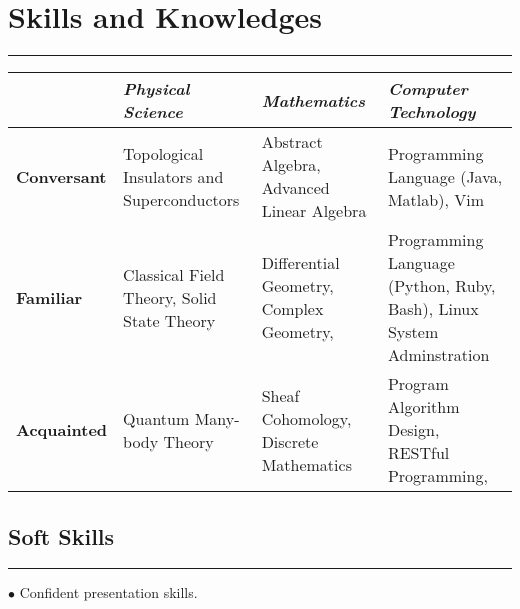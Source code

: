 \documentclass[letterpaper]{article}
\renewenvironment{itemize}{
  \begin{list}{}{
    \setlength{\leftmargin}{.5em}
  }
}{
  \end{list}
}
\begin{document}
\section*{Skills and Knowledges}
\vspace{-8pt}
\hrule height .7pt
\begin{table}[h]
    \centering
    \tabulinesep=1.2mm
    \begin{tabu}{  l X[l] X[l] X[l]  }
        &  \textit{Physical Science} & \textit{Mathematics} &
        \textit{Computer Technology} \\
    \hline
    \textbf{Conversant} & Topological Insulators and Superconductors 
        & Abstract Algebra, Advanced Linear Algebra 
            & Programming Language (Java, Matlab), Vim \\

    \textbf{Familiar} & Classical Field Theory, Solid State Theory
        & Differential Geometry, Complex Geometry,  
            & Programming Language (Python, Ruby, Bash), Linux System
            Adminstration\\

    \textbf{Acquainted} & Quantum Many-body Theory 
        & Sheaf Cohomology, Discrete Mathematics 
            & Program Algorithm Design, RESTful Programming, \\
    \bottomrule
    \end{tabu}
\end{table}
\subsection*{Soft Skills}
\vspace{-5pt}
\hrule height .4pt
\smallskip
\begin{itemize}
    \item $\bullet$ Confident presentation skills.
\end{itemize}
\end{document}
